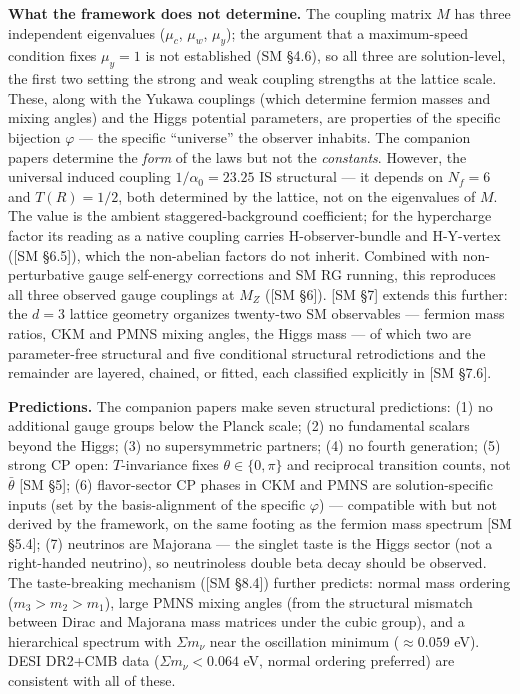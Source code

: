 \documentclass[
]{article}
\begin{document}
\textbf{What the framework does not determine.} The coupling matrix
\(M\) has three independent eigenvalues (\(\mu_c\), \(\mu_w\),
\(\mu_y\)); the argument that a maximum-speed condition fixes
\(\mu_y = 1\) is not established (SM §4.6), so all three are
solution-level, the first two setting the strong and weak coupling
strengths at the lattice scale. These, along with the Yukawa couplings
(which determine fermion masses and mixing angles) and the Higgs
potential parameters, are properties of the specific bijection
\(\varphi\) --- the specific ``universe'' the observer inhabits. The
companion papers determine the \emph{form} of the laws but not the
\emph{constants}. However, the universal induced coupling
\(1/\alpha_0 = 23.25\) IS structural --- it depends on \(N_f = 6\) and
\(T(R) = 1/2\), both determined by the lattice, not on the eigenvalues
of \(M\). The value is the ambient staggered-background coefficient; for
the hypercharge factor its reading as a native coupling carries
H-observer-bundle and H-Y-vertex ({[}SM §6.5{]}), which the non-abelian
factors do not inherit. Combined with non-perturbative gauge self-energy
corrections and SM RG running, this reproduces all three observed gauge
couplings at \(M_Z\) ({[}SM §6{]}). {[}SM §7{]} extends this further:
the \(d = 3\) lattice geometry organizes twenty-two SM observables ---
fermion mass ratios, CKM and PMNS mixing angles, the Higgs mass --- of
which two are parameter-free structural and five conditional structural
retrodictions and the remainder are layered, chained, or fitted, each
classified explicitly in {[}SM §7.6{]}.

\textbf{Predictions.} The companion papers make seven structural
predictions: (1) no additional gauge groups below the Planck scale; (2)
no fundamental scalars beyond the Higgs; (3) no supersymmetric partners;
(4) no fourth generation; (5) strong CP open: \(T\)-invariance fixes
\(\theta\in\{0,\pi\}\) and reciprocal transition counts, not
\(\bar{\theta}\) {[}SM §5{]}; (6) flavor-sector CP phases in CKM and
PMNS are solution-specific inputs (set by the basis-alignment of the
specific \(\varphi\)) --- compatible with but not derived by the
framework, on the same footing as the fermion mass spectrum {[}SM
§5.4{]}; (7) neutrinos are Majorana --- the singlet taste is the Higgs
sector (not a right-handed neutrino), so neutrinoless double beta decay
should be observed. The taste-breaking mechanism ({[}SM §8.4{]}) further
predicts: normal mass ordering (\(m_3 > m_2 > m_1\)), large PMNS mixing
angles (from the structural mismatch between Dirac and Majorana mass
matrices under the cubic group), and a hierarchical spectrum with
\(\Sigma m_\nu\) near the oscillation minimum (\(\approx 0.059\) eV).
DESI DR2+CMB data (\(\Sigma m_\nu < 0.064\) eV, normal ordering
preferred) are consistent with all of these.
\end{document}
